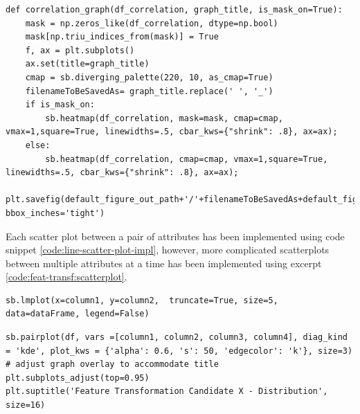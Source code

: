 \begin{landscape}
\begin{code}
\label{code:corr-heatmap-impl}
\begin{verbatim}
def correlation_graph(df_correlation, graph_title, is_mask_on=True):
    mask = np.zeros_like(df_correlation, dtype=np.bool)
    mask[np.triu_indices_from(mask)] = True
    f, ax = plt.subplots()
    ax.set(title=graph_title)
    cmap = sb.diverging_palette(220, 10, as_cmap=True)
    filenameToBeSavedAs= graph_title.replace(' ', '_')
    if is_mask_on:
        sb.heatmap(df_correlation, mask=mask, cmap=cmap, vmax=1,square=True, linewidths=.5, cbar_kws={"shrink": .8}, ax=ax);
    else:
        sb.heatmap(df_correlation, cmap=cmap, vmax=1,square=True, linewidths=.5, cbar_kws={"shrink": .8}, ax=ax);
    plt.savefig(default_figure_out_path+'/'+filenameToBeSavedAs+default_figure_ext, bbox_inches='tight')
\end{verbatim}
\end{code}
\end{landscape}

Each scatter plot between a pair of attributes has been implemented using code snippet \ref{code:line-scatter-plot-impl}, however, more complicated scatterplots between multiple attributes at a time has been implemented using excerpt \ref{code:feat-transf:scatterplot}.
\begin{code}
\label{code:line-scatter-plot-impl}
\begin{verbatim}
sb.lmplot(x=column1, y=column2,  truncate=True, size=5, data=dataFrame, legend=False)
\end{verbatim}
\end{code}

\begin{code}
\label{code:feat-transf:scatterplot}
\begin{verbatim}
sb.pairplot(df, vars =[column1, column2, column3, column4], diag_kind = 'kde', plot_kws = {'alpha': 0.6, 's': 50, 'edgecolor': 'k'}, size=3)
# adjust graph overlay to accommodate title
plt.subplots_adjust(top=0.95)
plt.suptitle('Feature Transformation Candidate X - Distribution', size=16)
\end{verbatim}
\end{code}

